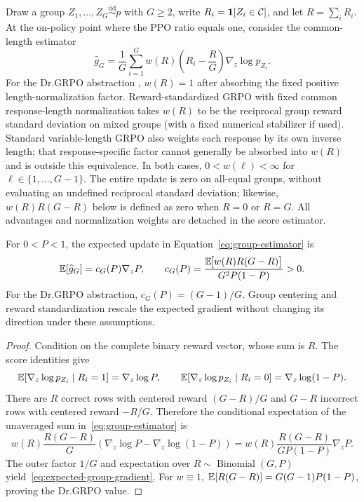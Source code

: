 Draw a group $Z_1,\ldots,Z_G\stackrel{\mathrm{iid}}{\sim}p$ with $G\ge2$,
write $R_i=\mathbf 1[Z_i\in\mathcal C]$, and let $R=\sum_iR_i$. At the on-policy
point where the PPO ratio equals one, consider the common-length estimator
\begin{equation}
  \widehat g_G
  =\frac1G\sum_{i=1}^G
   w(R)\left(R_i-\frac{R}{G}\right)\nabla_z\log p_{Z_i}.
  \label{eq:group-estimator}
\end{equation}
For the Dr.GRPO abstraction \citep{liu2025understanding}, $w(R)=1$ after
absorbing the fixed positive length-normalization factor. Reward-standardized
GRPO \citep{shao2024deepseekmath} with fixed common response-length
normalization takes $w(R)$ to be the reciprocal group reward standard
deviation on mixed groups (with a fixed numerical stabilizer if used).
Standard variable-length GRPO also weights each response by its own inverse
length; that response-specific factor cannot generally be absorbed into
$w(R)$ and is outside this equivalence.
In both cases, $0<w(\ell)<\infty$ for
$\ell\in\{1,\ldots,G-1\}$. The entire update is zero on all-equal
groups, without evaluating an undefined reciprocal standard deviation;
likewise, $w(R)R(G-R)$ below is defined as zero when $R=0$ or $R=G$. All
advantages and normalization weights are detached in the score estimator.

\begin{lemma}
\enforcehalffinalproseline
\label{lem:grpo-mean}
For $0<P<1$, the expected update in Equation~\eqref{eq:group-estimator} is
\begin{equation}
  \mathbb E[\widehat g_G]
  =c_G(P)\nabla_z P,
  \qquad
  c_G(P)=
  \frac{\mathbb E\!\big[w(R)R(G-R)\big]}{G^2P(1-P)}>0.
  \label{eq:expected-group-gradient}
\end{equation}
For the Dr.GRPO abstraction, $c_G(P)=(G-1)/G$. Group centering and reward
standardization rescale the expected gradient without changing its direction
under these assumptions.
\end{lemma}

\begin{proof}
\enforcehalffinalproseline
Condition on the complete binary reward vector, whose sum is $R$. The score
identities give
\[
  \mathbb E[\nabla_z\log p_{Z_i}\mid R_i=1]=\nabla_z\log P,
  \qquad
  \mathbb E[\nabla_z\log p_{Z_i}\mid R_i=0]
  =\nabla_z\log(1-P).
\]
There are $R$ correct rows with centered reward $(G-R)/G$ and $G-R$
incorrect rows with centered reward $-R/G$. Therefore the conditional
expectation of the unaveraged sum in~\eqref{eq:group-estimator} is
\[
  w(R)\frac{R(G-R)}{G}
  \left(\nabla_z\log P-\nabla_z\log(1-P)\right)
  =w(R)\frac{R(G-R)}{GP(1-P)}\nabla_zP.
\]
The outer factor $1/G$ and expectation over
$R\sim\operatorname{Binomial}(G,P)$ yield~\eqref{eq:expected-group-gradient}.
For $w\equiv1$,
$\mathbb E[R(G-R)]=G(G-1)P(1-P)$, proving the Dr.GRPO value.
\end{proof}

